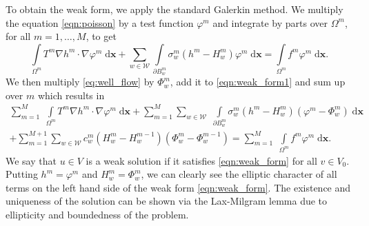 \documentclass{elsarticle}
\def\vc#1{\mathbf{\boldsymbol{#1}}}     %
\def\avg#1{\langle#1\rangle}
\newcommand{\dd}{\; \mathrm{d}}
\newcommand{\bx}{\vc{x}}
\newcommand{\noteJB}[1]{{\color{Blue} \textbf{JB: } \textit{#1}}}
\begin{document}
To obtain the weak form, we apply the standard Galerkin method. We multiply the equation \eqref{eqn:poisson} 
by a test function $\varphi^m$ and integrate by parts over $\Omega^m$, for all $m=1,\ldots,M$, to get
\begin{equation} \label{eqn:weak_form1}
  \int \limits_{\Omega^m} T^m \nabla h^m \cdot \nabla \varphi^m \dd\bx
  + \sum \limits_{w\in \mathcal{W}} \int \limits_{\partial B^m_w} \sigma^m_w (h^m - H_w^m) \varphi^m \dd\bx
  = \int \limits_{\Omega^m} f^m\varphi^m \dd\bx.
\end{equation}
We then multiply \eqref{eq:well_flow} by $\Phi^m_w$, add it to \eqref{eqn:weak_form1} 
and sum up over $m$ which results in
\begin{multline} \label{eqn:weak_form}
  \sum \limits_{m=1}^M \; \int \limits_{\Omega^m} T^m \nabla h^m \cdot \nabla \varphi^m \dd\bx
        + \sum \limits_{m=1}^M \sum \limits_{w\in \mathcal{W}} \; 
           \int \limits_{\partial B^m_w} \sigma^m_w\left(h^m-H^m_w\right)\left(\varphi^m-\Phi^m_w\right) \dd\bx \\
        + \sum \limits_{m=1}^{M+1} \sum\limits_{w\in\mathcal{W}}
          c_w^{m}\left( H^{m}_w-H_w^{m-1}\right)\left(\Phi^{m}_w - \Phi^{m-1}_w\right)           
  = \sum \limits_{m=1}^M \; \int \limits_{\Omega^m} f^m\varphi^m \dd\bx.   
\end{multline}
We say that $u\in V$ is a weak solution if it satisfies \eqref{eqn:weak_form} for all $v\in V_0$. 
Putting $h^m=\varphi^m$ and $H^m_w=\Phi^m_w$, we can clearly see the elliptic character of all terms on the 
left hand side of the weak form \eqref{eqn:weak_form}. The existence and uniqueness of the solution can be shown 
via the Lax-Milgram lemma due to ellipticity and boundedness of the problem.
\end{document}
